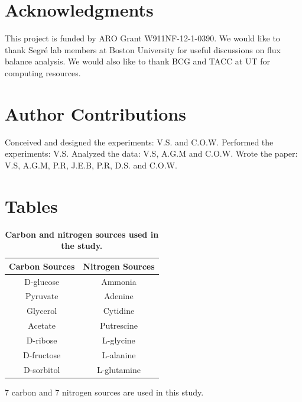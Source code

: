 \documentclass[12pt]{article}
\begin{document}
\section*{Acknowledgments}
This project is funded by ARO Grant W911NF-12-1-0390. We would like to thank Segr\'e lab members at Boston University for useful discussions on flux balance analysis. We would also like to thank BCG and TACC at UT for computing resources. 

\section*{Author Contributions}
Conceived and designed the experiments: V.S. and C.O.W. Performed the experiments: V.S. Analyzed the data: V.S, A.G.M and C.O.W. Wrote the paper: V.S, A.G.M, P.R, J.E.B, P.R, D.S. and C.O.W.




\newpage
\section*{Tables}
\begin{table}[!ht]
\caption{
\bf{Carbon and nitrogen sources used in the study.}}
\begin{tabular}{|c|c|}
\hline \hline
Carbon Sources & Nitrogen Sources \\
\hline
D-glucose & Ammonia \\
Pyruvate & Adenine \\
Glycerol & Cytidine \\
Acetate & Putrescine \\
D-ribose & L-glycine \\
D-fructose & L-alanine \\
D-sorbitol & L-glutamine \\
\hline
\end{tabular}
\begin{flushleft} 7 carbon and 7 nitrogen sources are used in this study.
\end{flushleft}
\label{tab:label}
 \end{table}
\end{document}
